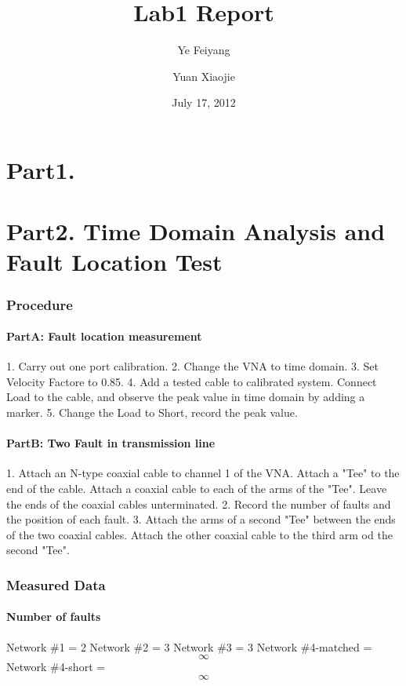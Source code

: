 \documentclass[11pt,oneside,a4paper]{report}
\begin{document}
\title{Lab1 Report}
\author{Ye Feiyang \and Yuan Xiaojie}
\date{July 17, 2012}
\maketitle

\part*{Part1. }

\part*{Part2. Time Domain Analysis and Fault Location Test}

\section*{Procedure}
\subsection*{PartA: Fault location measurement}
1. Carry out one port calibration.
2. Change the VNA to time domain.
3. Set Velocity Factore to 0.85.
4. Add a tested cable to calibrated system. Connect Load to the cable, and observe the peak value in time domain by adding a marker.
5. Change the Load to Short, record the peak value.
\subsection*{PartB: Two Fault in transmission line}
1. Attach an N-type coaxial cable to channel 1 of the VNA. Attach a "Tee" to the end of the cable. Attach a coaxial cable to each of the arms of the "Tee". Leave the ends of the coaxial cables unterminated.
2. Record the number of faults and the position of each fault.
3. Attach the arms of a second "Tee" between the ends of the two coaxial cables. Attach the other coaxial cable to the third arm od the second "Tee".

\section*{Measured Data}
\subsection*{Number of faults}
Network \#1 = 2
Network \#2 = 3
Network \#3 = 3
Network \#4-matched = \[\infty\]
Network \#4-short = \[\infty\]
\end{document}
